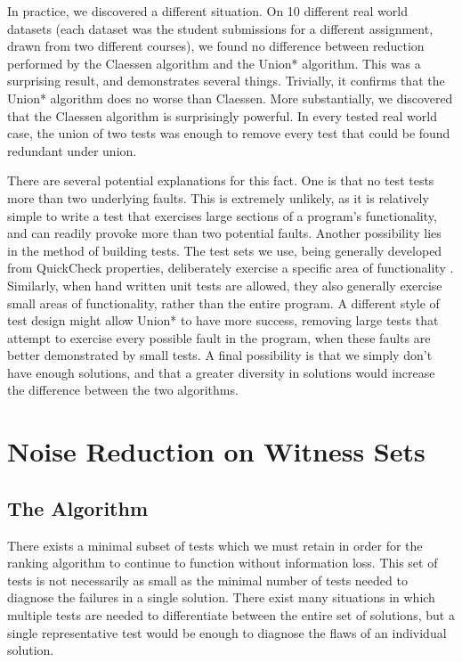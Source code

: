 \documentclass[11pt]{article}
\begin{document}
In practice, we discovered a different situation. On 10 different real world datasets (each dataset was the student submissions for a different assignment, drawn from two different courses), we found no difference between reduction performed by the Claessen algorithm and the Union* algorithm. This was a surprising result, and demonstrates several things. Trivially, it confirms that the Union* algorithm does no worse than Claessen. More substantially, we discovered that the Claessen algorithm is surprisingly powerful. In every tested real world case, the union of two tests was enough to remove every test that could be found redundant under union.

There are several potential explanations for this fact. One is that no test tests more than two underlying faults. This is extremely unlikely, as it is relatively simple to write a test that exercises large sections of a program's functionality, and can readily provoke more than two potential faults. Another possibility lies in the method of building tests. The test sets we use, being generally developed from QuickCheck properties, deliberately exercise a specific area of functionality \cite{QuickCheck}. Similarly, when hand written unit tests are allowed, they also generally exercise small areas of functionality, rather than the entire program. A different style of test design might allow Union* to have more success, removing large tests that attempt to exercise every possible fault in the program, when these faults are better demonstrated by small tests. A final possibility is that we simply don't have enough solutions, and that a greater diversity in solutions would increase the difference between the two algorithms.

\section{Noise Reduction on Witness Sets}
\subsection{The Algorithm}
There exists a minimal subset of tests which we must retain in order for the ranking algorithm to continue to function without information loss. This set of tests is not necessarily as small as the minimal number of tests needed to diagnose the failures in a single solution. There exist many situations in which multiple tests are needed to differentiate between the entire set of solutions, but a single representative test would be enough to diagnose the flaws of an individual solution.
\end{document}
